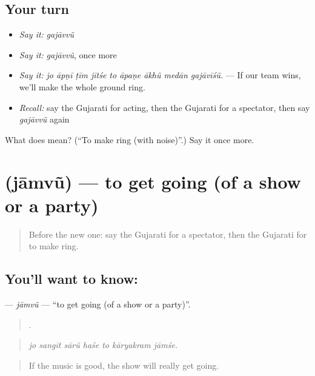 \subsection*{Your turn}
\begin{itemize}
\raggedright
  \item \emph{Say it:} \emph{gajāvvũ}
  \item \emph{Say it:} \emph{gajāvvũ}, once more
  \item \emph{Say it:} \emph{jo āpṇī ṭīm jītśe to āpaṇe ākhũ medān gajāvīśũ.} — If our team wins, we'll make the whole ground ring.
  \item \emph{Recall:} say the Gujarati for acting, then the Gujarati for a spectator, then say \emph{gajāvvũ} again
\end{itemize}

\begin{tcolorbox}[breakable,colback=teal!4,colframe=teal!35!black,title={Before you move on}]
What does  mean? (\textquotedblleft{}To make ring (with noise)\textquotedblright{}.) Say it once more.
\end{tcolorbox}
\section[\texorpdfstring{\gu{જામવું} (jāmvũ)}{જામવું (jāmvũ)}]{ (jāmvũ) — to get going (of a show or a party)}

\label{lesson:GU-C552-jaamvu}



\begin{quote}
Before the new one: say the Gujarati for a spectator, then the Gujarati for to make ring.
\end{quote}

\subsection*{You'll want to know: }
\textbf{} — \emph{jāmvũ} — \textquotedblleft{}to get going (of a show or a party)\textquotedblright{}.

\begin{quote}
      .
\end{quote}

\begin{quote}
\emph{jo sangīt sārũ haśe to kāryakram jāmśe.}
\end{quote}

\begin{quote}
If the music is good, the show will really get going.
\end{quote}

